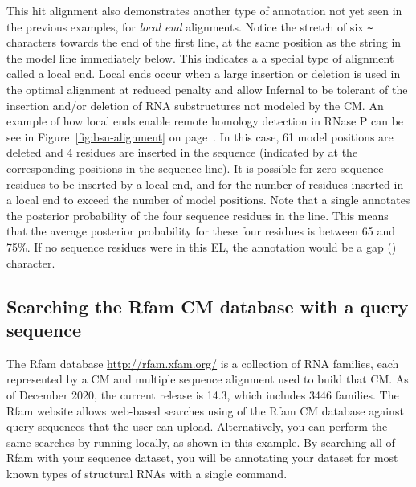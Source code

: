 This hit alignment also demonstrates another type of annotation not
yet seen in the previous examples, for \emph{local end}
alignments. Notice the stretch of six \verb+~+ characters towards the
end of the first  line, at the same position as the string
\otext{*[61]*} in the model line immediately below. This indicates a a
special type of alignment called a local end. Local ends occur when a
large insertion or deletion is used in the optimal alignment at
reduced penalty \citep{KleinEddy03} and allow Infernal to be tolerant
of the insertion and/or deletion of RNA substructures not modeled by
the CM. An example of how local ends enable remote homology detection
in RNase P can be see in Figure~\ref{fig:bsu-alignment} on
page~\pageref{fig:bsu-alignment}. In this case, 61 model positions are
deleted and 4 residues are inserted in the sequence (indicated by
\otext{*[ 4]*} at the corresponding positions in the sequence line).
It is possible for zero sequence residues to be inserted by a local
end, and for the number of residues inserted in a local end to exceed
the number of model positions. Note that a single  annotates
the posterior probability of the four sequence residues in the
 line. This means that the average posterior probability for
these four residues is between 65 and 75\%. If no sequence residues
were in this EL, the  annotation would be a gap ()
character.

\subsection{Searching the Rfam CM database with a query sequence}

The Rfam database \url{http://rfam.xfam.org/} is a collection
of RNA families, each represented by a CM and multiple sequence
alignment used to build that CM. As of December 2020, the current release
is 14.3, which includes 3446 families. The Rfam website allows
web-based searches using  of the Rfam CM database against
query sequences that the user can upload. Alternatively, you can perform
the same searches by running  locally, as shown in this
example. By searching all of Rfam with your sequence dataset, you will
be annotating your dataset for most known types of structural RNAs
with a single command.

